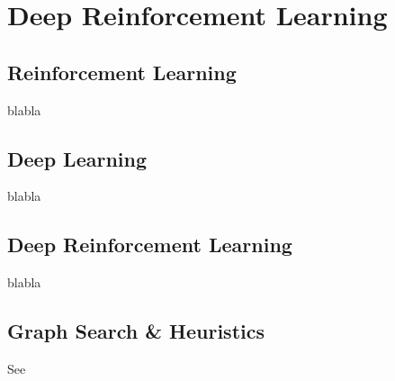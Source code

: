 
\chapter{Deep Reinforcement Learning} %

\label{Chapter1} %


\section{Reinforcement Learning}

blabla


\section{Deep Learning}

blabla

\section{Deep Reinforcement Learning}

blabla


\section{Graph Search \& Heuristics}

See \cite{Knuth}